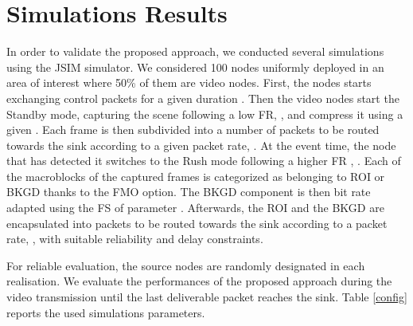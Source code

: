 \documentclass[conference,a4paper]{IEEEtran}
\begin{document}
\section{Simulations Results}
\label{Sim}
In order to validate the proposed approach, we conducted several simulations using the JSIM \cite{jsim1} simulator. We considered 100 nodes uniformly deployed in an area of interest where 50\% of them are video nodes. 
First, the nodes starts exchanging control packets for a given duration . Then  the video nodes start the Standby mode, capturing the scene following a low FR, , and compress it using a given . Each frame is then subdivided into a number of packets to be routed towards the sink according to a given packet rate, .
At the event time, the node that has detected it switches to the Rush mode following a higher FR , . Each of the macroblocks of the captured frames is categorized as belonging to ROI or BKGD thanks to the FMO option. The BKGD component is then bit rate adapted using the FS of parameter . Afterwards, the ROI and the BKGD are encapsulated into packets to be routed towards the sink according to a  packet rate, , with suitable reliability and delay constraints. 

For reliable evaluation, the source nodes are randomly designated in each realisation. We evaluate the performances of the proposed approach during the video transmission until the last deliverable packet reaches the sink. Table \ref{config} reports the used simulations parameters.
\end{document}
